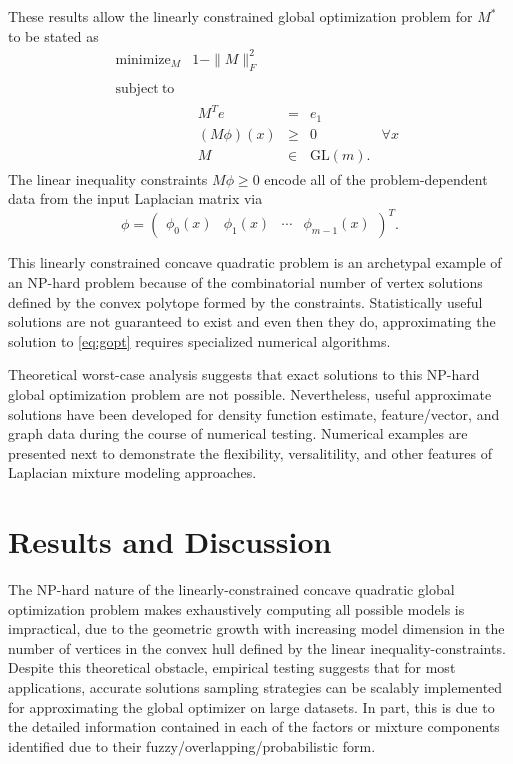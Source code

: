 \documentclass[10pt,letterpaper]{article}
\DeclareMathOperator*{\mini}{minimize}
\begin{document}
These results allow the linearly constrained global optimization problem for $M^{*}$ to be stated as
\begin{equation}
\begin{array}{cc}
\displaystyle \mini_M & 1 - \| M \|_F^2 \\
& \\
\mathrm{subject\ to} & \\
& \begin{array}{cccc} M^T e &=& e_1& \\ \left(M \phi\right)(x) &\geqslant& 0& \forall x \\ M &\in& \mathrm{GL}(m). &\end{array}
\end{array}\label{eq:gopt}
\end{equation}
The linear inequality constraints $M \phi \geqslant 0$ encode all of the problem-dependent data from the input Laplacian matrix via
\begin{equation*}
\phi = \left( \begin{array}{cccc} \phi_0(x) & \phi_1(x) & \cdots & \phi_{m - 1}(x) \end{array} \right)^T.
\end{equation*}

This linearly constrained concave quadratic problem is an archetypal example of an NP-hard problem because of the combinatorial number of vertex solutions defined by the convex polytope formed by the constraints.
Statistically useful solutions are not guaranteed to exist and even then they do, approximating the solution to \ref{eq:gopt} requires specialized numerical algorithms.

Theoretical worst-case analysis suggests that exact solutions to this NP-hard global optimization problem are not possible.
Nevertheless, useful approximate solutions have been developed for density function estimate, feature/vector, and graph data during the course of numerical testing.
Numerical examples are presented next to demonstrate the flexibility, versalitility, and other features of Laplacian mixture modeling approaches.
\section*{Results and Discussion}\label{sec:results}
The NP-hard nature of the linearly-constrained concave quadratic global optimization problem makes exhaustively computing all possible models is impractical, due to the geometric growth with increasing model dimension in the number of vertices in the convex hull defined by the linear inequality-constraints.
Despite this theoretical obstacle, empirical testing suggests that for most applications, accurate solutions sampling strategies can be scalably implemented for approximating the global optimizer on large datasets.
In part, this is due to the detailed information contained in each of the factors or mixture components identified due to their fuzzy/overlapping/probabilistic form.
\end{document}
